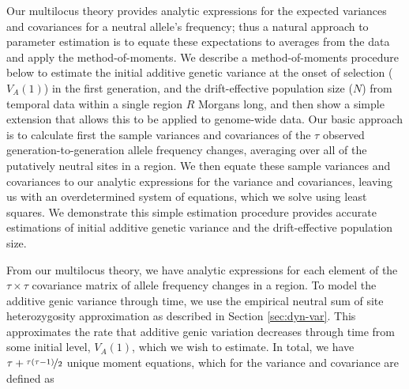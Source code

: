 \documentclass[11pt]{article}
\begin{document}
Our multilocus theory provides analytic expressions for the expected variances
and covariances for a neutral allele's frequency; thus a natural approach to
parameter estimation is to equate these expectations to averages from the data
and apply the method-of-moments. We describe a method-of-moments procedure
below to estimate the initial additive genetic variance at the onset of
selection ($V_A(1)$) in the first generation, and the drift-effective
population size ($N$) from temporal data within a single region $R$ Morgans
long, and then show a simple extension that allows this to be applied to
genome-wide data. Our basic approach is to calculate first the sample variances
and covariances of the $\tau$ observed generation-to-generation allele
frequency changes, averaging over all of the putatively neutral sites in a
region. We then equate these sample variances and covariances to our analytic
expressions for the variance and covariances, leaving us with an overdetermined
system of equations, which we solve using least squares. We demonstrate this
simple estimation procedure provides accurate estimations of initial additive
genetic variance and the drift-effective population size.

From our multilocus theory, we have analytic expressions for each element of
the $\tau \times \tau$ covariance matrix of allele frequency changes in a
region. To model the additive genic variance through time, we use the empirical
neutral sum of site heterozygosity approximation as described in Section
\ref{sec:dyn-var}. This approximates the rate that additive genic variation
decreases through time from some initial level, $V_A(1)$, which we wish to
estimate. In total, we have $\tau + \nicefrac{\tau(\tau-1)}{2}$ unique moment
equations, which for the variance and covariance are defined as
\end{document}
